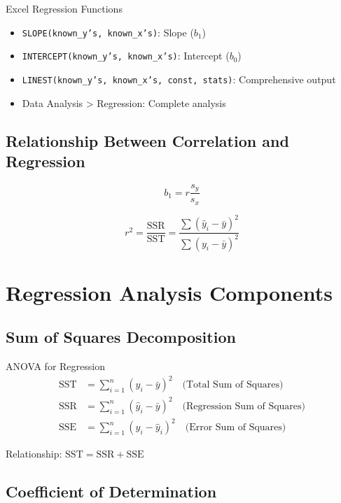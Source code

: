 \documentclass[12pt,a4paper]{book}
\begin{document}
\begin{example}{Excel Regression Functions}
\begin{itemize}
    \item \texttt{SLOPE(known\_y's, known\_x's)}: Slope ($b_1$)
    \item \texttt{INTERCEPT(known\_y's, known\_x's)}: Intercept ($b_0$)
    \item \texttt{LINEST(known\_y's, known\_x's, const, stats)}: Comprehensive output
    \item Data Analysis > Regression: Complete analysis
\end{itemize}
\end{example}

\subsection{Relationship Between Correlation and Regression}

\[
b_1 = r \frac{s_y}{s_x}
\]

\[
r^2 = \frac{\text{SSR}}{\text{SST}} = \frac{\sum(\hat{y}_i - \bar{y})^2}{\sum(y_i - \bar{y})^2}
\]

\section{Regression Analysis Components}

\subsection{Sum of Squares Decomposition}

\begin{definition}{ANOVA for Regression}
\begin{align}
\text{SST} &= \sum_{i=1}^{n}(y_i - \bar{y})^2 \quad \text{(Total Sum of Squares)}\\
\text{SSR} &= \sum_{i=1}^{n}(\hat{y}_i - \bar{y})^2 \quad \text{(Regression Sum of Squares)}\\
\text{SSE} &= \sum_{i=1}^{n}(y_i - \hat{y}_i)^2 \quad \text{(Error Sum of Squares)}
\end{align}

Relationship: $\text{SST} = \text{SSR} + \text{SSE}$
\end{definition}

\subsection{Coefficient of Determination}
\end{document}
